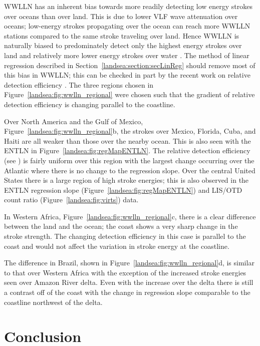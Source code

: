 WWLLN has an inherent bias towards more readily detecting low energy strokes over oceans than over land.
This is due to lower VLF wave attenuation over oceans; low-energy strokes propagating over the ocean can reach more WWLLN stations compared to the same stroke traveling over land.
Hence WWLLN is naturally biased to predominately detect only the highest energy strokes over land and relatively more lower energy strokes over water \citep{Hutchins2012}.
The method of linear regression described in Section~\ref{landsea:section:secLinReg} should remove most of this bias in WWLLN; this can be checked in part by the recent work on relative detection efficiency \citep{Hutchins2012a}.
The three regions chosen in Figure~\ref{landsea:fig:wwlln_regional} were chosen such that the gradient of relative detection efficiency is changing parallel to the coastline.

Over North America and the Gulf of Mexico, Figure~\ref{landsea:fig:wwlln_regional}b, the strokes over Mexico, Florida, Cuba, and Haiti are all weaker than those over the nearby ocean.
This is also seen with the ENTLN in Figure~\ref{landsea:fig:regMapENTLN}.
The relative detection efficiency (see \citet{Hutchins2012a}) is fairly uniform over this region with the largest change occurring over the Atlantic where there is no change to the regression slope.
Over the central United States there is a large region of high stroke energies; this is also observed in the ENTLN regression slope (Figure~\ref{landsea:fig:regMapENTLN}) and LIS/OTD count ratio (Figure~\ref{landsea:fig:virts}) data. 

In Western Africa, Figure~\ref{landsea:fig:wwlln_regional}c, there is a clear difference between the land and the ocean; the coast shows a very sharp change in the stroke strength.
The changing detection efficiency in this case is parallel to the coast and would not affect the variation in stroke energy at the coastline.

The difference in Brazil, shown in Figure~\ref{landsea:fig:wwlln_regional}d, is similar to that over Western Africa with the exception of the increased stroke energies seen over Amazon River delta.
Even with the increase over the delta there is still a contrast off of the coast with the change in regression slope comparable to the coastline northwest of the delta.

\section{Conclusion}

